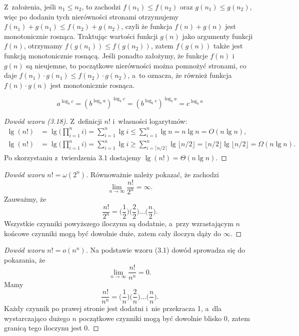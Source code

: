 
\exercise %
Z~założenia, jeśli $n_1\le n_2$, to zachodzi $f(n_1)\le f(n_2)$ oraz $g(n_1)\le g(n_2)$, więc po dodaniu tych nierówności stronami otrzymujemy $f(n_1)+g(n_1)\le f(n_2)+g(n_2)$, czyli że funkcja $f(n)+g(n)$ jest monotonicznie rosnąca.
Traktując wartości funkcji $g(n)$ jako argumenty funkcji $f(n)$, otrzymamy $f(g(n_1))\le f(g(n_2))$, zatem $f(g(n))$ także jest funkcją monotonicznie rosnącą.
Jeśli ponadto założymy, że funkcje $f(n)$ i~$g(n)$ są nieujemne, to początkowe nierówności można pomnożyć stronami, co daje $f(n_1)\cdot g(n_1)\le f(n_2)\cdot g(n_2)$, a~to oznacza, że również funkcja $f(n)\cdot g(n)$ jest monotonicznie rosnąca.

\exercise %
\[
	a^{\log_bc} = \left(b^{\log_ba}\right)^{\log_bc} = \left(b^{\log_bc}\right)^{\log_ba} = c^{\log_ba}
\]

\exercise %
\begin{proof}[Dowód wzoru (3.18)]
	Z~definicji $n!$ i~własności logarytmów:
	\begin{align*}
		\lg(n!) &= \lg\biggl(\prod_{i=1}^ni\biggr) = \sum_{i=1}^n\lg i \le \sum_{i=1}^n\lg n = n\lg n = O(n\lg n), \\[1mm]
		\lg(n!) &= \lg\biggl(\prod_{i=1}^ni\biggr) = \sum_{i=1}^n\lg i \ge \sum_{i=\lceil n/2\rceil}^n\!\!\lg\lfloor n/2\rfloor = \lfloor n/2\rfloor\lg\lfloor n/2\rfloor = \Omega(n\lg n).
	\end{align*}
	Po skorzystaniu z~twierdzenia 3.1 dostajemy $\lg(n!)=\Theta(n\lg n)$.
\end{proof}

\begin{proof}[Dowód wzoru $n!=\omega(2^n)$]
	Równoważnie należy pokazać, że zachodzi
	\[
		\lim_{n\to\infty}\frac{n!}{2^n} = \infty.
	\]
	Zauważmy, że
	\[
	    \frac{n!}{2^n} = \biggl(\frac{1}{2}\biggr)\biggl(\frac{2}{2}\biggr)\dots\biggl(\frac{n}{2}\biggr).
	\]
	Wszystkie czynniki powyższego iloczynu są dodatnie, a~przy wzrastającym $n$ końcowe czynniki mogą być dowolnie duże, zatem cały iloczyn dąży do $\infty$.
\end{proof}

\begin{proof}[Dowód wzoru $n!=o(n^n)$]
	Na podstawie wzoru (3.1) dowód sprowadza się do pokazania, że
	\[
		\lim_{n\to\infty}\frac{n!}{n^n} = 0.
	\]
	Mamy
	\[
	    \frac{n!}{n^n} = \biggl(\frac{1}{n}\biggr)\biggl(\frac{2}{n}\biggr)\dots\biggl(\frac{n}{n}\biggr).
	\]
	Każdy czynnik po prawej stronie jest dodatni i~nie przekracza 1, a~dla wystarczająco dużego $n$ początkowe czynniki mogą być dowolnie blisko 0, zatem granicą tego iloczynu jest 0.
\end{proof}

